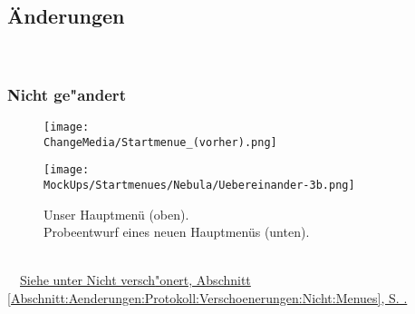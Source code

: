 %



\newpage





\subsection*{Änderungen}

~\\


\subsubsection*{Nicht ge{"a}ndert}
\label{Abschnitt:Anhang:Aenderungen:Nicht}


	\begin{figure}[ht]
	
		\label{Abb:Aenderungen:Startmenue}
		\centering

		\texttt{[image: \\ChangeMedia/Startmenue\_(vorher).png]}
		
	\end{figure}
	

	\begin{figure}[ht]
	
		\label{Abb:Aenderungen:Startmenue_(nachher)}
		\centering

		\texttt{[image: \\MockUps/Startmenues/Nebula/Uebereinander-3b.png]}
		
		\caption{Unser Hauptmenü (oben).\\Probeentwurf eines neuen Hauptmenüs (unten).}

	\end{figure}
	
~\\~\mousecursor~\hyperref[Abschnitt:Aenderungen:Protokoll:Verschoenerungen:Nicht:Menues]{Siehe unter \glqq Nicht versch{"o}nert\grqq, Abschnitt \ref{Abschnitt:Aenderungen:Protokoll:Verschoenerungen:Nicht:Menues}, S. \pageref{Abschnitt:Aenderungen:Protokoll:Verschoenerungen:Nicht:Menues}.}
